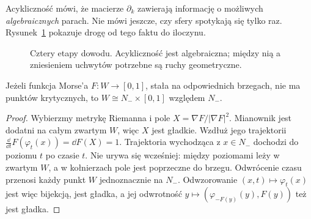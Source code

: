 Acykliczność mówi, że macierze
$\partial_k$ zawierają informację
o możliwych \emph{algebraicznych}
parach. Nie mówi jeszcze, czy
sfery spotykają się tylko raz.
Rysunek~\ref{fig:plan-smale-19}
pokazuje drogę od tego faktu
do iloczynu.

\begin{figure}[htbp]
\centering
{}
\caption{Cztery etapy dowodu. Acykliczność
jest algebraiczna; między nią a zniesieniem
uchwytów potrzebne są ruchy geometryczne.}
\label{fig:plan-smale-19}
\end{figure}

\begin{lemat}
\label{lem:brak-krytycznych-hc-19}
Jeżeli funkcja Morse'a $F:W\to[0,1]$,
stała na odpowiednich brzegach,
nie ma punktów krytycznych, to
$W\cong N_-\times[0,1]$
względem $N_-$.
\end{lemat}
\begin{proof}
Wybierzmy metrykę Riemanna i pole
$X=\nabla F/|\nabla F|^2$.
Mianownik jest dodatni na całym
zwartym $W$, więc $X$ jest gładkie.
Wzdłuż jego trajektorii
$\frac{\dd}{\dd t}F(\varphi_t(x))
 =\dd F(X)=1$.
Trajektoria wychodząca z $x\in N_-$
dochodzi do poziomu $t$ po czasie $t$.
Nie urywa się wcześniej: między
poziomami leży w zwartym $W$,
a w kołnierzach pole jest poprzeczne
do brzegu. Odwrócenie czasu
przenosi każdy punkt $W$
jednoznacznie na $N_-$.
Odwzorowanie $(x,t)\mapsto\varphi_t(x)$
jest więc bijekcją, jest gładka,
a jej odwrotność
$y\mapsto(\varphi_{-F(y)}(y),F(y))$
też jest gładka.
\end{proof}

